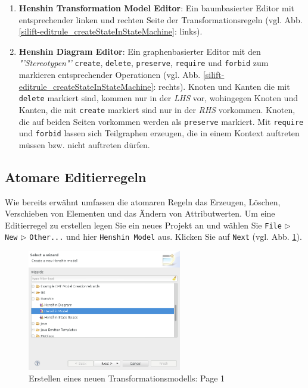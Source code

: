 \begin{enumerate}

\item \textbf{Henshin Transformation Model Editor}: 
Ein baumbasierter Editor mit ent\-sprech\-en\-der linken und rechten Seite der Transformationsregeln (vgl. Abb.\ref{silift-editrule_createStateInStateMachine}: links).

\item \textbf{Henshin Diagram Editor}: 
Ein graphenbasierter Editor mit den \textit{"'Stereotypen"'} \texttt{create}, \texttt{delete}, \texttt{preserve}, \texttt{require} und \texttt{forbid} zum markieren entsprechender Operationen (vgl. Abb. \ref{silift-editrule_createStateInStateMachine}: rechts).
Knoten und Kanten die mit \texttt{delete} markiert sind, kommen nur in der \textit{LHS} vor, wohingegen Knoten und Kanten, die mit \texttt{create} markiert sind nur in der \textit{RHS} vorkommen.
Knoten, die auf beiden Seiten vorkommen werden als \texttt{preserve} markiert.
Mit \texttt{require} und \texttt{forbid} lassen sich Teilgraphen erzeugen, die in einem Kontext auftreten müssen bzw. nicht auftreten dürfen.
\end{enumerate}

\subsection{Atomare Editierregeln}

Wie bereits erwähnt umfassen die atomaren Regeln das Erzeugen, Löschen, Verschieben von Elementen und das Ändern von Attributwerten.
Um eine Editierregel zu erstellen legen Sie ein neues Projekt an und wählen Sie \texttt{File} $\triangleright$ \texttt{New} $\triangleright$ \texttt{Other...} und hier \texttt{Henshin Model} aus. 
Klicken Sie auf \texttt{Next} (vgl. Abb. \ref{henshin-create_henshin_model_page01}).\\


\begin{figure}[H]
\centering
\includegraphics[width=0.6\textwidth]{editrules/graphics/henshin-create_henshin_model_page01.png}
\caption{Erstellen eines neuen Transformationsmodells: Page 1}
\label{henshin-create_henshin_model_page01}
\end{figure}

